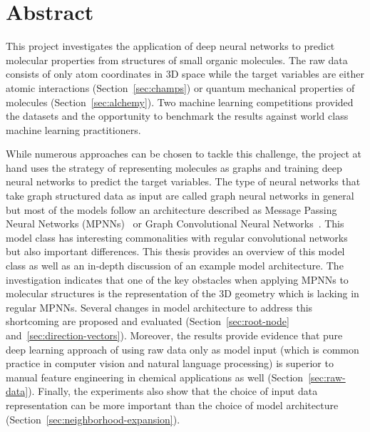 
%
%


\chapter*{Abstract}

\noindent This project investigates the application of deep neural networks to predict molecular properties from structures of small organic molecules. The raw data consists of only atom coordinates in 3D space while the target variables are either atomic interactions (Section~\ref{sec:champs}) or quantum mechanical properties of molecules (Section~\ref{sec:alchemy}). Two machine learning competitions provided the datasets and the opportunity to benchmark the results against world class machine learning practitioners.

While numerous approaches can be chosen to tackle this challenge, the project at hand uses the strategy of representing molecules as graphs and training deep neural networks to predict the target variables. The type of neural networks that take graph structured data as input are called graph neural networks in general but most of the models follow an architecture described as Message Passing Neural Networks (MPNNs)~\cite{Gilmer2017} or Graph Convolutional Neural Networks~\cite{Schutt2017}. This model class has interesting commonalities with regular convolutional networks but also important differences. This thesis provides an overview of this model class as well as an in-depth discussion of an example model architecture. The investigation indicates that one of the key obstacles when applying MPNNs to molecular structures is the representation of the 3D geometry which is lacking in regular MPNNs. Several changes in model architecture to address this shortcoming are proposed and evaluated (Section~\ref{sec:root-node} and~\ref{sec:direction-vectors}). Moreover, the results provide evidence that pure deep learning approach of using raw data only as model input (which is common practice in computer vision and natural language processing) is superior to manual feature engineering in chemical applications as well (Section~\ref{sec:raw-data}). Finally, the experiments also show that the choice of input data representation can be more important than the choice of model architecture (Section~\ref{sec:neighborhood-expansion}).

